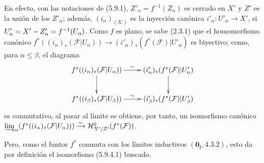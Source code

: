 En efecto, con las notaciones de (5.9.1), $Z'_\alpha=f^{-1}(Z_\alpha)$ es
cerrado en $X'$ y $Z'$ es la unión de los $Z'_\alpha$; además,
$(i_\alpha)_{(X')}$ es la inyección canónica
$i'_\alpha:U'_\alpha\to X'$, si
$U'_\alpha=X'- Z'_\alpha=f^{-1}(U_\alpha)$. Como $f$ es plano, se sabe
(2.3.1) que el homomorfismo canónico
$f^*((i_\alpha)_*(\mathcal F|U_\alpha))
\longrightarrow(i'_\alpha)_*(f^*(\mathcal F)|U'_\alpha)$
es biyectivo; como, para $\alpha\leq\beta$, el diagrama
\[
\xymatrix{
f^*((i_\alpha)_*(\mathcal F|U_\alpha))
  \ar[r]^{\sim}\ar[d] &
(i'_\alpha)_*(f^*(\mathcal F)|U'_\alpha)\ar[d]\\
f^*((i_\beta)_*(\mathcal F|U_\beta))
  \ar[r]^{\sim} &
(i'_\beta)_*(f^*(\mathcal F)|U'_\beta)
}
\]
es conmutativo, al pasar al límite se obtiene, por tanto, un isomorfismo canónico
$\varinjlim_\alpha
(f^*((i_\alpha)_*(\mathcal F|U_\alpha)))
\xrightarrow{\sim}\mathcal H^0_{X'/Z'}(f^*(\mathcal F))$.

Pero, como el funtor $f^*$ conmuta con los límites inductivos
$(\mathbf{0}_{\mathrm I},4.3.2)$, esto da por definición el isomorfismo
(5.9.4.1) buscado.
